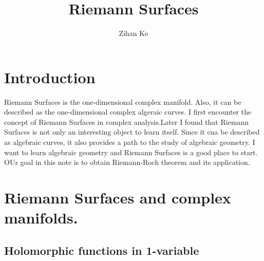 \documentclass{article}
\title{Riemann Surfaces}
\author{Zihan Ke}
\begin{document}
\maketitle
\section*{Introduction}
Riemann Surfaces is the one-dimensional complex manifold. Also, it can be described as the one-dimensional complex algeraic curves. I first encounter the concept of Riemann Surfaces in complex analysis.Later I found that Riemann Surfaces is not only an interesting object to learn itself. Since it cna be described as algebraic curves, it also provides a path to the study of algebraic geometry. I want to learn algebraic geometry and Riemann Surfaces is a good place to start. 
OUr goal in this note is to obtain Riemann-Roch theorem and its application.
\newpage
\tableofcontents 
\newpage

\section{Riemann Surfaces and complex \textbf{manifolds}.}
\subsection{Holomorphic functions in 1-variable}
\end{document}
